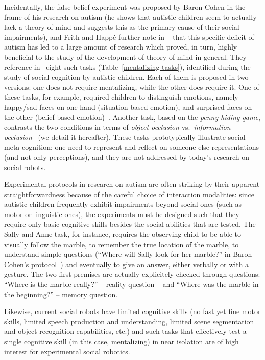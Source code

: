 \documentclass{sig-alternate}
\begin{document}
Incidentally, the false belief experiment was proposed by Baron-Cohen in the
frame of his research on autism (he shows that autistic children seem to
actually lack a theory of mind and suggests this as the primary cause of their
social impairments), and Frith and Happé further note in ~\cite{frith1994autism}
that this specific deficit of autism has led to a large amount of research which
proved, in turn, highly beneficial to the study of the development of theory of
mind in general. They reference in~\cite{frith1994autism} eight such tasks
(Table~\ref{mentalizing-tasks}),
identified during the study of social cognition by autistic children. Each of
them is proposed in two versions: one does not require mentalizing, while the
other does require it.  One of these tasks, for example, required children to
distinguish emotions, namely happy/sad faces on one hand (situation-based
emotion), and surprised faces on the other (belief-based
emotion)~\cite{baron1993children}.  Another task, based on the
\emph{penny-hiding game}, contrasts the two conditions in terms of \emph{object
occlusion} vs.~\emph{information occlusion}~\cite{baron1992out} (we detail it
hereafter). These tasks prototypically illustrate social meta-cognition: one
need to represent and reflect on someone else representations (and not only
perceptions), and they are not addressed by today's research on social robots.

Experimental protocols in research on autism are often striking by their
apparent straightforwardness because of the careful choice of interaction
modalities: since autistic children frequently exhibit impairments beyond social
ones (such as motor or linguistic ones), the experiments must be designed such
that they require only basic cognitive skills besides the social abilities that
are tested. The Sally and Anne task, for instance, requires the observing child
to be able to visually follow the marble, to remember the true location of the
marble, to understand simple questions (``Where will Sally look for her
marble?'' in Baron-Cohen's protocol~\cite{baron1985does}) and eventually to give
an answer, either verbally or with a gesture. The two first premises are
actually explicitely checked through questions: ``Where is the marble really?''
-- reality question -- and ``Where was the marble in the beginning?'' -- memory
question.

Likewise, current social robots have limited cognitive skills (no fast yet fine
motor skills, limited speech production and understanding, limited scene
segmentation and object recognition capabilities, etc.) and such tasks
that effectively test a single cognitive skill (in this case, mentalizing) in
near isolation are of high interest for experimental social robotics.
\end{document}
